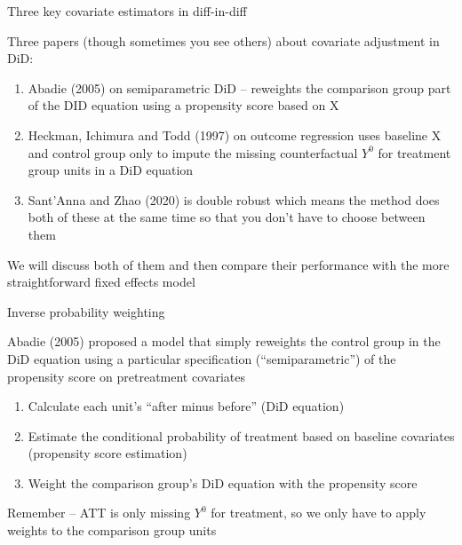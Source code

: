 \documentclass{beamer}
\begin{document}
\begin{frame}{Three key covariate estimators in diff-in-diff}

Three papers (though sometimes you see others) about covariate adjustment in DiD:
\begin{enumerate}
\item Abadie (2005) on semiparametric DiD -- reweights the comparison group part of the DID equation using a propensity score based on X
\item Heckman, Ichimura and Todd (1997) on outcome regression uses baseline X and control group only to impute the missing counterfactual $Y^0$ for treatment group units in a DiD equation
\item Sant'Anna and Zhao (2020) is double robust which means the method does both of these at the same time so that you don't have to choose between them
\end{enumerate}

\bigskip

We will discuss both of them and then compare their performance with the more straightforward fixed effects model

\end{frame}






\begin{frame}{Inverse probability weighting}


 Abadie (2005) proposed a model that simply reweights the control group in the DiD equation using a particular specification (``semiparametric'') of the propensity score on pretreatment covariates

	\begin{enumerate}
	\item Calculate each unit's ``after minus before'' (DiD equation)
	\item Estimate the conditional probability of treatment based on baseline covariates (propensity score estimation)
	\item Weight the comparison group's DiD equation with the propensity score
	\end{enumerate}

Remember -- ATT is only missing $Y^0$ for treatment, so we only have to apply weights to the comparison group units

\end{frame}
\end{document}
